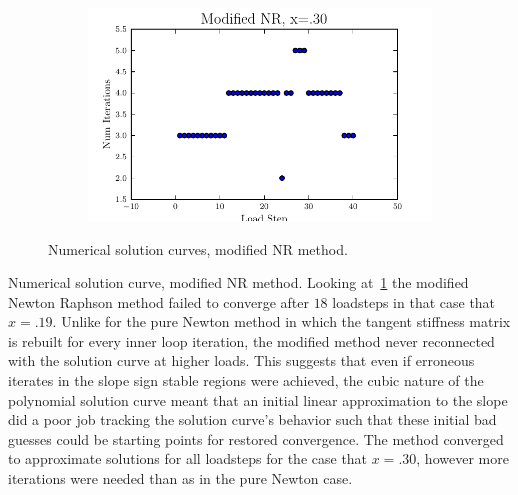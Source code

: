 \documentclass[10pt,letterpaper]{article}
\begin{document}
\begin{figure}[!tbh]
\begin{subfigure}[b]{.6\textwidth}
    \caption{}
    \label{fig3:label:c}
  \end{subfigure}
  \hfill
  \begin{subfigure}[b]{.6\textwidth}
    \includegraphics[width=\textwidth]{moded_nr_x30_conv.pdf}
    \caption{}
    \label{fig3:label:d}
  \end{subfigure}
  \caption{Numerical solution curves, modified NR method.}
\end{figure}

Numerical solution curve, modified NR method. Looking at~\ref{fig3:label:c} the modified Newton Raphson method failed to converge after $18$ loadsteps in that case that $x=.19$. Unlike for the pure Newton method in which the tangent stiffness matrix is rebuilt for every inner loop iteration, the modified method never reconnected with the solution curve at higher loads. This suggests that even if erroneous iterates in the slope sign stable regions were achieved, the cubic nature of the polynomial solution curve meant that an initial linear approximation to the slope did a poor job tracking the solution curve's behavior such that these initial bad guesses could be starting points for restored convergence. The method converged to approximate solutions for all loadsteps for the case that $x=.30$, however more iterations were needed than as in the pure Newton case.
\end{document}
